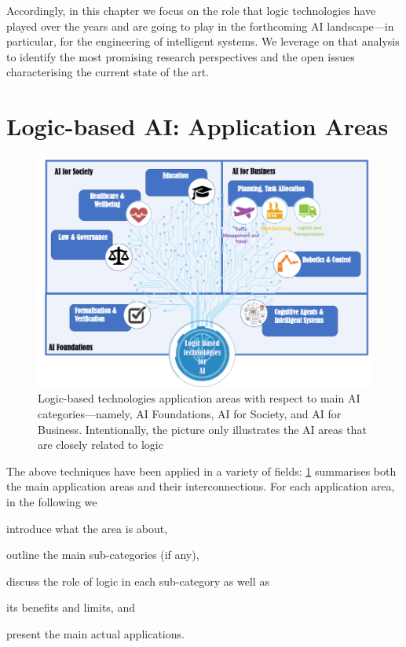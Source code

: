 \documentclass[12pt,a4paper,openright,twoside]{book}
\begin{document}
Accordingly, in this chapter we focus on the role that logic technologies have played over the years and are going to play in the forthcoming AI landscape---in particular, for the engineering of intelligent systems.
%
We leverage on that analysis to identify the most promising research perspectives and the open issues characterising the current state of the art.

\section{Logic-based AI: Application Areas}\label{sec:application}

\begin{figure}
    \centering\includegraphics[width=\linewidth]{figures/logicForAI.png}
    \caption[Logic-based technologies application areas w.r.t. main AI categories]{Logic-based technologies application areas with respect to main AI categories---namely, AI Foundations, AI for Society, and AI for Business.  Intentionally, the picture only illustrates the AI areas that are closely related to logic}
    \label{fig:logicBasedAIArea}
\end{figure}

The above techniques have been applied in a variety of fields: \cref{fig:logicBasedAIArea} summarises both the main application areas and their interconnections.
%
For each application area, in the following we
%
\begin{inlinelist}
    \item introduce what the area is about,
    \item outline the main sub-categories (if any),
    \item discuss the role of logic in each sub-category as well as
    \item its benefits and limits, and
    \item present the main actual applications.
\end{inlinelist}
\end{document}
